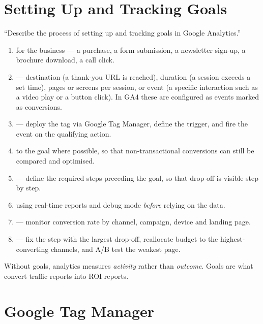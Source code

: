 \documentclass{MMTextbook}
\begin{document}
\section{Setting Up and Tracking Goals}

\begin{keybox}
``Describe the process of setting up and tracking goals in Google Analytics.''
\end{keybox}

\begin{enumerate}
\item {} for the business --- a purchase, a
      form submission, a newsletter sign-up, a brochure download, a call click.
\item {} --- destination (a thank-you URL is reached),
      duration (a session exceeds a set time), pages or screens per session, or
      event (a specific interaction such as a video play or a button click). In
      GA4 these are configured as events marked as conversions.
\item {} --- deploy the tag via Google Tag Manager,
      define the trigger, and fire the event on the qualifying action.
\item {} to the goal where possible, so that
      non-transactional conversions can still be compared and optimised.
\item {} --- define the required steps preceding the
      goal, so that drop-off is visible step by step.
\item {} using real-time reports and debug mode \emph{before} relying
      on the data.
\item {} --- monitor conversion rate by channel, campaign,
      device and landing page.
\item {} --- fix the step with the largest drop-off,
      reallocate budget to the highest-converting channels, and A/B test the
      weakest page.
\end{enumerate}

\begin{keybox}
Without goals, analytics measures \emph{activity} rather than \emph{outcome}.
Goals are what convert traffic reports into ROI reports.
\end{keybox}

\section{Google Tag Manager}
\end{document}
